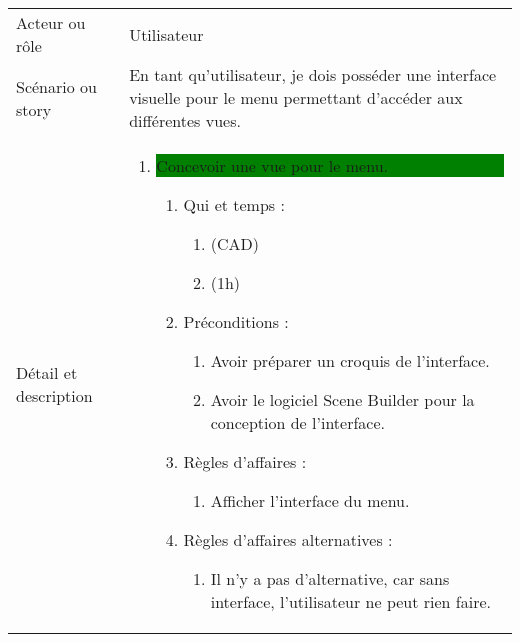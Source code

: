 \begin{longtable}{|l|p{}|}
\hline
    \rowcolor{Gray}
    \multicolumn{2}{|l|}{3} \\
\hline
    Acteur ou rôle & Utilisateur \\
\hline
    Scénario ou story & En tant qu’utilisateur, je
    dois posséder une interface
    visuelle pour le menu permettant d'accéder aux différentes vues. \\
\hline
    Détail et description &
        \begin{enumerate}[label*=\arabic*.]
            \item \colorbox{Green}{\parbox{13cm}{ Concevoir une vue pour le menu.}}
                \begin{enumerate}[label*=\arabic*.]
                                \item Qui et temps :
                                \begin{enumerate}[label*=\arabic*.]
                                    \item (CAD)
                                    \item (1h)
                                \end{enumerate}
                                \item Préconditions :
                                \begin{enumerate}[label*=\arabic*.]
                                    \item Avoir préparer un croquis de l'interface.
                                    \item Avoir le logiciel Scene Builder pour la conception de l'interface.
                                \end{enumerate}
                                \item Règles d'affaires :
                                \begin{enumerate}[label*=\arabic*.]
                                    \item Afficher l'interface du menu.
                                \end{enumerate}
                                \item Règles d'affaires alternatives :
                                \begin{enumerate}[label*=\arabic*.]
                                    \item Il n'y a pas d'alternative, car sans interface, l'utilisateur ne peut rien faire.
                                \end{enumerate}

\end{enumerate}
\end{enumerate}
\end{longtable}
